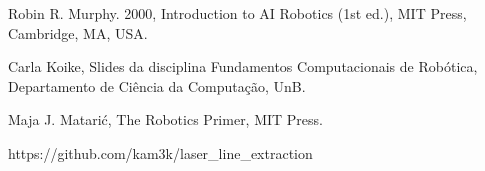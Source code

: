 \documentclass{llncs}
\begin{document}
\begin{thebibliography}{9}

	Robin R. Murphy. 2000,
	Introduction to AI Robotics (1st ed.),
	MIT Press, Cambridge, MA, USA. 
	
	Carla Koike,
	Slides da disciplina Fundamentos Computacionais de Robótica,
	Departamento de Ciência da Computação, UnB.
	
	Maja J. Matarić,
	The Robotics Primer,
	MIT Press.
	
	https://github.com/kam3k/laser\_line\_extraction

\end{thebibliography}
\end{document}
